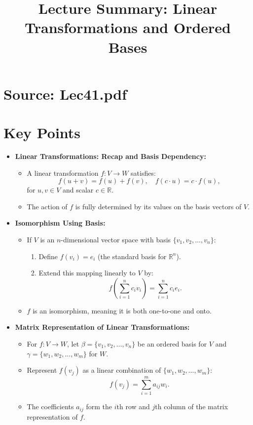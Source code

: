\documentclass{article}
\title{Lecture Summary: Linear Transformations and Ordered Bases}
\author{}
\date{}
\begin{document}
\maketitle

\section*{Source: Lec41.pdf}

\section*{Key Points}

\begin{itemize}
  \item \textbf{Linear Transformations: Recap and Basis Dependency:}
    \begin{itemize}
      \item A linear transformation $f: V \to W$ satisfies:
        \[
          f(u + v) = f(u) + f(v), \quad f(c \cdot u) = c \cdot f(u),
        \]
        for $u, v \in V$ and scalar $c \in \mathbb{R}$.
      \item The action of $f$ is fully determined by its values on the basis vectors of $V$.
    \end{itemize}

  \item \textbf{Isomorphism Using Basis:}
    \begin{itemize}
      \item If $V$ is an $n$-dimensional vector space with basis $\{v_1, v_2, \dots, v_n\}$:
        \begin{enumerate}
          \item Define $f(v_i) = e_i$ (the standard basis for $\mathbb{R}^n$).
          \item Extend this mapping linearly to $V$ by:
            \[
              f\left(\sum_{i=1}^n c_i v_i\right) = \sum_{i=1}^n c_i e_i.
            \]
        \end{enumerate}
      \item $f$ is an isomorphism, meaning it is both one-to-one and onto.
    \end{itemize}

  \item \textbf{Matrix Representation of Linear Transformations:}
    \begin{itemize}
      \item For $f: V \to W$, let $\beta = \{v_1, v_2, \dots, v_n\}$ be an ordered basis for $V$ and $\gamma = \{w_1, w_2, \dots, w_m\}$ for $W$.
      \item Represent $f(v_j)$ as a linear combination of $\{w_1, w_2, \dots, w_m\}$:
        \[
          f(v_j) = \sum_{i=1}^m a_{ij} w_i.
        \]
      \item The coefficients $a_{ij}$ form the $i$th row and $j$th column of the matrix representation of $f$.
    \end{itemize}


\end{itemize}
\end{document}
